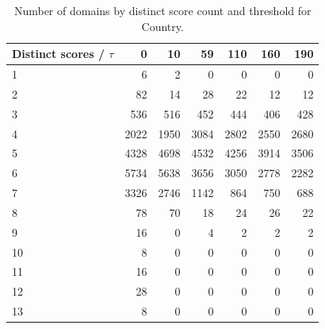 \begin{table}[htbp]
\centering
\small
\begin{tabular}{l r r r r r r}
\hline
Distinct scores / $\tau$ & 0 & 10 & 59 & 110 & 160 & 190 \\
\hline
1 & 6 & 2 & 0 & 0 & 0 & 0 \\
2 & 82 & 14 & 28 & 22 & 12 & 12 \\
3 & 536 & 516 & 452 & 444 & 406 & 428 \\
4 & 2022 & 1950 & 3084 & 2802 & 2550 & 2680 \\
5 & 4328 & 4698 & 4532 & 4256 & 3914 & 3506 \\
6 & 5734 & 5638 & 3656 & 3050 & 2778 & 2282 \\
7 & 3326 & 2746 & 1142 & 864 & 750 & 688 \\
8 & 78 & 70 & 18 & 24 & 26 & 22 \\
9 & 16 & 0 & 4 & 2 & 2 & 2 \\
10 & 8 & 0 & 0 & 0 & 0 & 0 \\
11 & 16 & 0 & 0 & 0 & 0 & 0 \\
12 & 28 & 0 & 0 & 0 & 0 & 0 \\
13 & 8 & 0 & 0 & 0 & 0 & 0 \\
\hline
\end{tabular}
\caption{Number of domains by distinct score count and threshold for Country.}
\label{tab:distinct-scores-Country}
\end{table}

